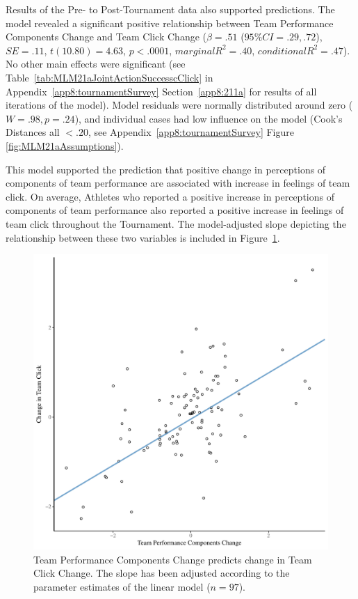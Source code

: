\begin{CJK}{UTF8}{gbsn}
Results of the Pre- to Post-Tournament data also supported predictions.  The model revealed a significant positive relationship between Team Performance Components Change and Team Click Change ($\beta = .51$ ($95\% CI =  .29, .72$), $SE = .11$, $t(10.80) = 4.63$, $p < .0001$, $marginal R^2 = .40$, $conditional R^2 = .47$).  No other main effects were significant (see Table~\ref{tab:MLM21aJointActionSuccesscClick} in Appendix~\ref{app8:tournamentSurvey} Section~\ref{app8:211a} for results of all iterations of the model).  Model residuals were normally distributed around zero ($W = .98, p = .24$), and individual cases had low influence on the model (Cook's Distances all  $< .20 $, see Appendix~\ref{app8:tournamentSurvey} Figure \ref{fig:MLM21aAssumptions}).



This model supported the prediction that positive change in perceptions of components of team performance are associated with increase in feelings of team click.  On average, Athletes who reported a positive increase in perceptions of components of team performance also reported a positive increase in feelings of team click throughout the Tournament.  The model-adjusted slope depicting the relationship between these two variables is included in Figure~\ref{fig:jasClickDeltaModelSLope}.

\begin{figure}[htbp]
  \centering
\includegraphics[scale=.5]{images/jasClickDeltaModelSlope}
  \caption{Team Performance Components Change predicts change in Team Click Change. The slope has been adjusted according to the parameter estimates of the linear model ($n = 97$).}
  \label{fig:jasClickDeltaModelSLope}
\end{figure}


\end{CJK}
